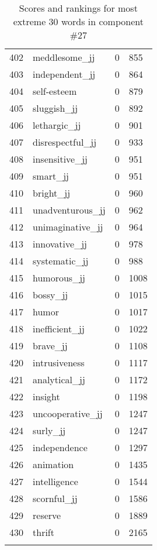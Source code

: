 \begin{longtable}[!htbp]{| rlr@{.}l |}
    402 & meddlesome\_jj & 0 & 855 \\
    403 & independent\_jj & 0 & 864 \\
    404 & self-esteem & 0 & 879 \\
    405 & sluggish\_jj & 0 & 892 \\
    406 & lethargic\_jj & 0 & 901 \\
    407 & disrespectful\_jj & 0 & 933 \\
    408 & insensitive\_jj & 0 & 951 \\
    409 & smart\_jj & 0 & 951 \\
    410 & bright\_jj & 0 & 960 \\
    411 & unadventurous\_jj & 0 & 962 \\
    412 & unimaginative\_jj & 0 & 964 \\
    413 & innovative\_jj & 0 & 978 \\
    414 & systematic\_jj & 0 & 988 \\
    415 & humorous\_jj & 0 & 1008 \\
    416 & bossy\_jj & 0 & 1015 \\
    417 & humor & 0 & 1017 \\
    418 & inefficient\_jj & 0 & 1022 \\
    419 & brave\_jj & 0 & 1108 \\
    420 & intrusiveness & 0 & 1117 \\
    421 & analytical\_jj & 0 & 1172 \\
    422 & insight & 0 & 1198 \\
    423 & uncooperative\_jj & 0 & 1247 \\
    424 & surly\_jj & 0 & 1247 \\
    425 & independence & 0 & 1297 \\
    426 & animation & 0 & 1435 \\
    427 & intelligence & 0 & 1544 \\
    428 & scornful\_jj & 0 & 1586 \\
    429 & reserve & 0 & 1889 \\
    430 & thrift & 0 & 2165 \\
    \hline
    \caption{Scores and rankings for most extreme 30 words in component \#27} \\
\end{longtable}

